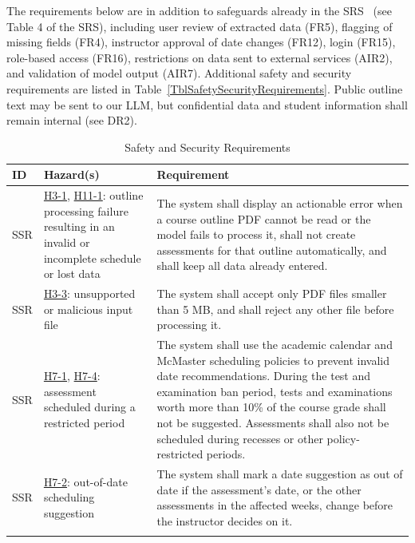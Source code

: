\documentclass{article}
\newcounter{ssrnum} %
\newcommand{\ssrthessrnum}{SSR\thessrnum}
\newcommand{\hazref}[1]{\hyperref[haz:#1]{#1}}
\begin{document}
\noindent The requirements below are in addition to safeguards already in the SRS~\citep{TeamBVSH2026SRS} (see Table 4 of the SRS), including user review of extracted data (FR5), flagging of missing fields (FR4), instructor approval of date changes (FR12), login (FR15), role-based access (FR16), restrictions on data sent to external services (AIR2), and validation of model output (AIR7). Additional safety and security requirements are listed in Table~\ref{TblSafetySecurityRequirements}. Public outline text may be sent to our LLM, but confidential data and student information shall remain internal (see DR2).

\begin{table}[H]
\caption{Safety and Security Requirements}
\label{TblSafetySecurityRequirements}
\begin{tabularx}{\textwidth}{>{\raggedright\arraybackslash}p{}
  >{\raggedright\arraybackslash}p{}
  >{\raggedright\arraybackslash}X}
\toprule
\textbf{ID} & \textbf{Hazard(s)} & \textbf{Requirement}\\
\midrule
\leavevmode{}{ssrnum}\ssrthessrnum \label{SSR_ProcessFailure} & \hazref{H3-1}, \hazref{H11-1}: outline processing failure resulting in an invalid or incomplete schedule or lost data & The system shall display an actionable error when a course outline PDF cannot be read or the model fails to process it, shall not create assessments for that outline automatically, and shall keep all data already entered.\\ \addlinespace
\leavevmode{}{ssrnum}\ssrthessrnum \label{SSR_AcceptedFiles} & \hazref{H3-3}: unsupported or malicious input file & The system shall accept only PDF files smaller than 5 MB, and shall reject any other file before processing it.\\ \addlinespace
\leavevmode{}{ssrnum}\ssrthessrnum \label{SSR_RestrictedDates} & \hazref{H7-1}, \hazref{H7-4}: assessment scheduled during a restricted period & The system shall use the academic calendar and McMaster scheduling policies to prevent invalid date recommendations. During the test and examination ban period, tests and examinations worth more than 10\% of the course grade shall not be suggested. Assessments shall also not be scheduled during recesses or other policy-restricted periods.\\ \addlinespace
\leavevmode{}{ssrnum}\ssrthessrnum \label{SSR_StaleSuggestion} & \hazref{H7-2}: out-of-date scheduling suggestion & The system shall mark a date suggestion as out of date if the assessment's date, or the other assessments in the affected weeks, change before the instructor decides on it.\\ \addlinespace

\end{tabularx}
\end{table}
\end{document}
